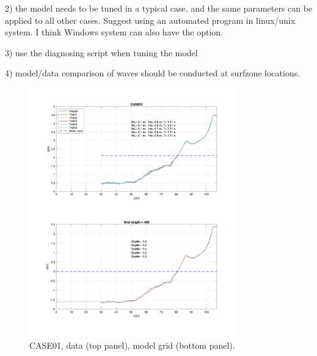 \documentclass[preprint,10pt]{elsarticle}
\begin{document}
2) the model needs to be tuned in a typical case, and the same parameters can be applied to all other cases. Suggest using an automated program in linux/unix system. I think Windows system can also have the option. 

3) use the diagnosing script when tuning the model

4) model/data comparison of waves should be conducted at surfzone locations.  


\newpage

 \begin{figure}
\begin{center}
 \includegraphics[width=0.8\textwidth]{../data/preprocessing/plots/CASE01.jpg}
 \caption{CASE01, data (top panel), model grid (bottom panel).}
 \label{lineargrid}
 \end{center}
 \end{figure}
 
\end{document}
